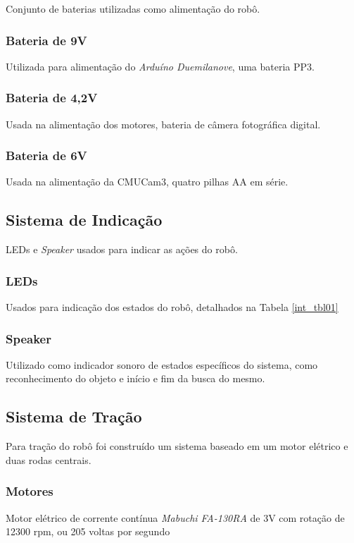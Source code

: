 Conjunto de baterias utilizadas como alimentação do robô.

\subsubsection{Bateria de 9V}
Utilizada para alimentação do \textit{Arduíno Duemilanove}, uma bateria PP3.

\subsubsection{Bateria de 4,2V}
Usada na alimentação dos motores, bateria de câmera fotográfica digital.

\subsubsection{Bateria de 6V}
Usada na alimentação da CMUCam3, quatro pilhas AA em série.

\subsection{Sistema de Indicação}

LEDs e \textit{Speaker} usados para indicar as ações do robô.

\subsubsection{LEDs}
Usados para indicação dos estados do robô, detalhados na Tabela \ref{int_tbl01}

\subsubsection{Speaker}
Utilizado como indicador sonoro de estados específicos do sistema, como reconhecimento do objeto e início e fim da busca do mesmo.

\subsection{Sistema de Tração}

Para tração do robô foi construído um sistema baseado em um motor elétrico e duas rodas centrais.

\subsubsection{Motores}
Motor elétrico de corrente contínua \textit{Mabuchi FA-130RA} de 3V com rotação de 12300 rpm, ou 205 voltas por segundo \cite{Robo2d}

